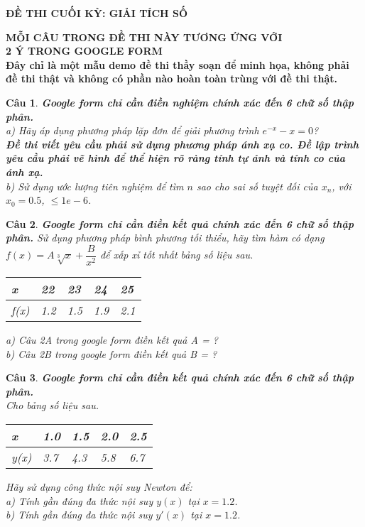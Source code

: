 \documentclass[11pt]{article}
\newtheorem{bt}{Câu}
\begin{document}


\begin{center}
	\textbf{ĐỀ THI CUỐI KỲ: GIẢI TÍCH SỐ} 
\begin{shaded}
\textbf{MỖI CÂU TRONG ĐỀ THI NÀY TƯƠNG ỨNG VỚI \\ 2 Ý TRONG GOOGLE FORM \\ Đây chỉ là một mẫu demo đề thi thầy soạn để minh họa, không phải đề thi thật và không có phần nào hoàn toàn trùng với đề thi thật.
}
\end{shaded}
\end{center}

\begin{bt} \textbf{Google form chỉ cần điền nghiệm chính xác đến 6 chữ số thập phân.} \\
a) Hãy áp dụng phương pháp lặp đơn để giải phương trình $e^{-x} - x  = 0 $? \\
\textbf{Đề thi viết yêu cầu phải sử dụng phương pháp ánh xạ co. Đề lập trình yêu cầu phải vẽ hình để thể hiện rõ ràng tính tự ánh và tính co của ánh xạ.} \\
b) Sử dụng ước lượng tiên nghiệm để tìm $n$ sao cho sai số tuyệt đối của $x_n$, với $x_0 = 0.5$,
$\leq 1e-6$.
\end{bt}


\begin{bt} \textbf{Google form chỉ cần điền kết quả chính xác đến 6 chữ số thập phân.}
Sử dụng phương pháp bình phương tối thiểu, hãy tìm hàm có dạng $f(x) = A \sqrt[3]{x}+ \dfrac{B}{x^2}$ để xấp xỉ tốt nhất bảng số liệu sau. 
\begin{center}
	\begin{tabular}[5]{l|l|l|l|l}
		x    & 22  &  23  &  24  &  25 \\ \hline
		f(x) & 1.2 & 1.5  & 1.9  & 2.1
	\end{tabular}	
\end{center}
% 
a) Câu 2A trong google form điền kết quả A = ? \\
b) Câu 2B trong google form điền kết quả B = ? \\
\end{bt}

\begin{bt} \textbf{Google form chỉ cần điền kết quả chính xác đến 6 chữ số thập phân.} \\
Cho bảng số liệu sau. 
\begin{center}
	\begin{tabular}[5]{l|l|l|l|l}
		x    & 1.0 & 1.5 & 2.0 & 2.5 \\ \hline
		y(x) & 3.7 & 4.3 & 5.8 & 6.7
	\end{tabular}	
\end{center}
% 
Hãy sử dụng công thức nội suy Newton để: \\
a) Tính gần đúng đa thức nội suy $y(x)$ tại $x=1.2$.\\
b) Tính gần đúng đa thức nội suy $y'(x)$ tại $x=1.2$.	
\end{bt}
\end{document}
